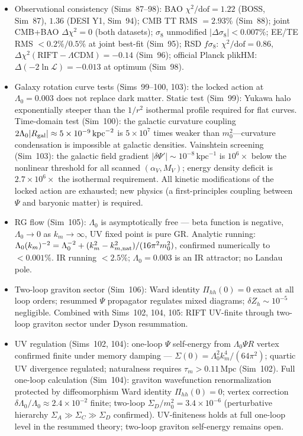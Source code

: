 \documentclass[12pt,a4paper]{article}
\begin{document}
\begin{itemize}
  \item Observational consistency (Sims~87--98): BAO $\chi^2/\mathrm{dof} = 1.22$ (BOSS, Sim~87), $1.36$ (DESI Y1, Sim~94); CMB TT RMS $= 2.93\%$ (Sim~88); joint CMB+BAO $\Delta\chi^2 = 0$ (both datasets); $\sigma_8$ unmodified $|\Delta\sigma_8| < 0.007\%$; EE/TE RMS $< 0.2\%/0.5\%$ at joint best-fit (Sim~95); RSD $f\sigma_8$: $\chi^2/\mathrm{dof}=0.86$, $\Delta\chi^2(\mathrm{RIFT}-\Lambda\mathrm{CDM})=-0.14$ (Sim~96); official Planck plikHM: $\Delta(-2\ln\mathcal{L})=-0.013$ at optimum (Sim~98).
  \item Galaxy rotation curve tests (Sims~99--100, 103): the locked action at $\Lambda_0=0.003$ does not replace dark matter.  Static test (Sim~99): Yukawa halo exponentially steeper than the $1/r^2$ isothermal profile required for flat curves.  Time-domain test (Sim~100): the galactic curvature coupling $2\Lambda_0|R_{\rm gal}|\approx5\times10^{-9}\,{\rm kpc}^{-2}$ is $5\times10^7$ times weaker than $m_0^2$---curvature condensation is impossible at galactic densities.  Vainshtein screening (Sim~103): the galactic field gradient $|\delta\Psi'|\sim10^{-8}\,\mathrm{kpc}^{-1}$ is $10^6\times$ below the nonlinear threshold for all scanned $(\alpha_V,M_V)$; energy density deficit is $2.7\times10^6\times$ the isothermal requirement.  All kinetic modifications of the locked action are exhausted; new physics (a first-principles coupling between $\Psi$ and baryonic matter) is required.
  \item RG flow (Sim~105): $\Lambda_0$ is asymptotically free --- beta function is negative, $\Lambda_0\to 0$ as $k_m\to\infty$, UV fixed point is pure GR.  Analytic running: $\Lambda_0(k_m)^{-2} = \Lambda_0^{-2}+(k_m^2-k_{m,\rm nat}^2)/(16\pi^2 m_0^2)$, confirmed numerically to $<0.001\%$.  IR running $<2.5\%$; $\Lambda_0=0.003$ is an IR attractor; no Landau pole.
  \item Two-loop graviton sector (Sim~106): Ward identity $\Pi_{hh}(0)=0$ exact at all loop orders; resummed $\Psi$ propagator regulates mixed diagrams; $\delta Z_h\sim10^{-5}$ negligible. Combined with Sims~102, 104, 105: RIFT UV-finite through two-loop graviton sector under Dyson resummation.
  \item UV regulation (Sims~102, 104): one-loop $\Psi$ self-energy from $\Lambda_0\Psi R$ vertex confirmed finite under memory damping --- $\Sigma(0) = \Lambda_0^2 k_m^4/(64\pi^2)$; quartic UV divergence regulated; naturalness requires $\tau_m > 0.11\,\mathrm{Mpc}$ (Sim~102).  Full one-loop calculation (Sim~104): graviton wavefunction renormalization protected by diffeomorphism Ward identity $\Pi_{hh}(0)=0$; vertex correction $\delta\Lambda_0/\Lambda_0 \approx 2.4\times10^{-2}$ finite; two-loop $\Sigma_D/m_0^2 = 3.4\times10^{-6}$ (perturbative hierarchy $\Sigma_A \gg \Sigma_C \gg \Sigma_D$ confirmed).  UV-finiteness holds at full one-loop level in the resummed theory; two-loop graviton self-energy remains open.

\end{itemize}
\end{document}
